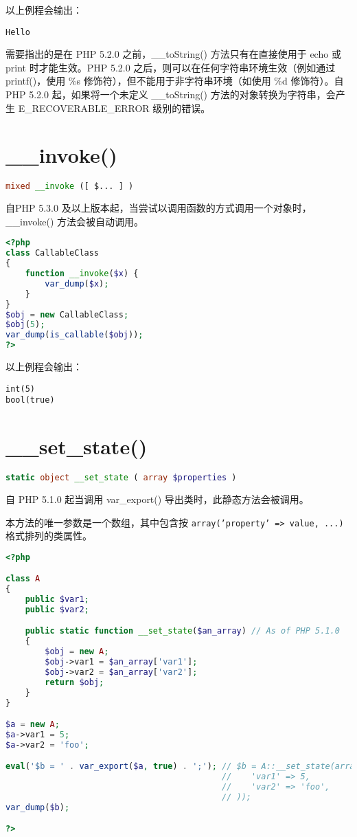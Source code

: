 以上例程会输出：

\begin{verbatim}
Hello
\end{verbatim}

需要指出的是在 PHP 5.2.0 之前，\_\_toString() 方法只有在直接使用于 echo 或 print 时才能生效。PHP 5.2.0 之后，则可以在任何字符串环境生效（例如通过 printf()，使用 \%s 修饰符），但不能用于非字符串环境（如使用 \%d 修饰符）。自 PHP 5.2.0 起，如果将一个未定义 \_\_toString() 方法的对象转换为字符串，会产生 E\_RECOVERABLE\_ERROR 级别的错误。

\section{\_\_invoke()}


\begin{lstlisting}[language=PHP]
mixed __invoke ([ $... ] )
\end{lstlisting}

自PHP 5.3.0 及以上版本起，当尝试以调用函数的方式调用一个对象时，\_\_invoke() 方法会被自动调用。

\begin{lstlisting}[language=PHP]
<?php
class CallableClass 
{
    function __invoke($x) {
        var_dump($x);
    }
}
$obj = new CallableClass;
$obj(5);
var_dump(is_callable($obj));
?>
\end{lstlisting}

以上例程会输出：

\begin{verbatim}
int(5)
bool(true)
\end{verbatim}

\section{\_\_set\_state()}


\begin{lstlisting}[language=PHP]
static object __set_state ( array $properties )
\end{lstlisting}

自 PHP 5.1.0 起当调用 var\_export() 导出类时，此静态方法会被调用。

本方法的唯一参数是一个数组，其中包含按 \texttt{array('property' => value, ...)} 格式排列的类属性。

\begin{lstlisting}[language=PHP]
<?php

class A
{
    public $var1;
    public $var2;

    public static function __set_state($an_array) // As of PHP 5.1.0
    {
        $obj = new A;
        $obj->var1 = $an_array['var1'];
        $obj->var2 = $an_array['var2'];
        return $obj;
    }
}

$a = new A;
$a->var1 = 5;
$a->var2 = 'foo';

eval('$b = ' . var_export($a, true) . ';'); // $b = A::__set_state(array(
                                            //    'var1' => 5,
                                            //    'var2' => 'foo',
                                            // ));
var_dump($b);

?>
\end{lstlisting}

